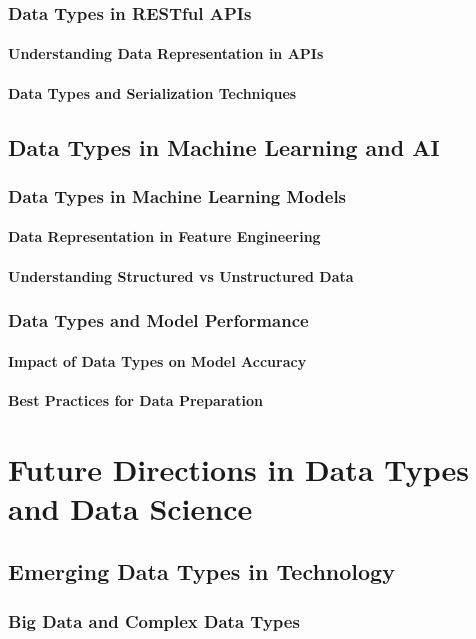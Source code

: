 \documentclass[12pt, oneside]{book}
\begin{document}
\subsection{Data Types in RESTful APIs}
\subsubsection{Understanding Data Representation in APIs}
\subsubsection{Data Types and Serialization Techniques}
\section{Data Types in Machine Learning and AI}
\subsection{Data Types in Machine Learning Models}
\subsubsection{Data Representation in Feature Engineering}
\subsubsection{Understanding Structured vs Unstructured Data}
\subsection{Data Types and Model Performance}
\subsubsection{Impact of Data Types on Model Accuracy}
\subsubsection{Best Practices for Data Preparation}

\chapter{Future Directions in Data Types and Data Science}
\section{Emerging Data Types in Technology}
\subsection{Big Data and Complex Data Types}
\end{document}
